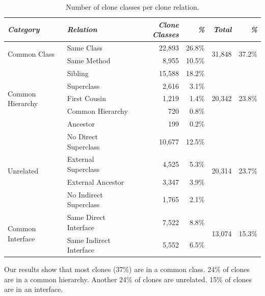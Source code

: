 \begin{table}[H]
\centering
\begin{tabular}{@{}llrrrr@{}}
\toprule
\textit{\textbf{Category}} & \textit{\textbf{Relation}} & \textit{\textbf{Clone Classes}} & \textit{\textbf{\%}} & \textit{\textbf{Total}} & \textit{\textbf{\%}} \\ \midrule
\multirow{2}{*}{Common Class} & Same Class & 22,893 & 26.8\% & \multirow{2}{*}{31,848} & \multirow{2}{*}{37.2\%} \\ \cmidrule(lr){2-4}
 & Same Method & 8,955 & 10.5\% & & \\ \midrule
\multirow{5}{*}{Common Hierarchy} & Sibling & 15,588 & 18.2\% & \multirow{5}{*}{20,342}& \multirow{5}{*}{23.8\%} \\ \cmidrule(lr){2-4}
 & Superclass & 2,616 & 3.1\% & & \\ \cmidrule(lr){2-4}
 & First Cousin & 1,219 & 1.4\% & & \\ \cmidrule(lr){2-4}
 & Common Hierarchy & 720 & 0.8\% & & \\ \cmidrule(lr){2-4}
 & Ancestor & 199 & 0.2\% & & \\ \midrule
\multirow{4}{*}{Unrelated} & No Direct Superclass & 10,677 & 12.5\% & \multirow{4}{*}{20,314}& \multirow{4}{*}{23.7\%} \\ \cmidrule(lr){2-4}
 & External Superclass & 4,525 & 5.3\% & & \\ \cmidrule(lr){2-4}
 & External Ancestor & 3,347 & 3.9\% & & \\ \cmidrule(lr){2-4}
 & No Indirect Superclass & 1,765 & 2.1\% & & \\ \midrule
\multirow{2}{*}{Common Interface} & Same Direct Interface & 7,522 & 8.8\% & \multirow{2}{*}{13,074} & \multirow{2}{*}{15.3\%} \\ \cmidrule(lr){2-4}
 & Same Indirect Interface & 5,552 & 6.5\% & & \\ \bottomrule
\end{tabular}
\caption{Number of clone classes per clone relation.}
\label{tab:relation}
\end{table}

Our results show that most clones (37\%) are in a common class. 24\% of clones are in a common hierarchy. Another 24\% of clones are unrelated. 15\% of clones are in an interface.

